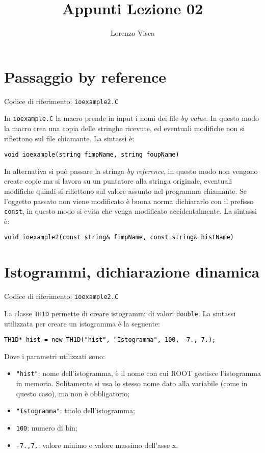 \documentclass{article}
\title{Appunti Lezione 02}
\author{Lorenzo Visca}
\date{}
\newcommand{\ttt}{\texttt}
\newcommand{\tcpp}[1]{\hspace{10pt}\colorbox{background}{\textcolor{black}{\texttt{#1}}}}
\begin{document}
\maketitle


\section{Passaggio by reference}
Codice di riferimento: \ttt{ioexample2.C} \vspace{10pt}

In \ttt{ioexample.C} la macro prende in input i nomi dei file \textit{by value}. In questo modo la macro crea una copia delle stringhe ricevute, ed eventuali modifiche non si riflettono sul file chiamante. La sintassi è:

\tcpp{void ioexample(string fimpName, string foupName)}

In alternativa si può passare la stringa \textit{by reference}, in questo modo non vengono create copie ma si lavora su un puntatore alla stringa originale, eventuali modifiche quindi si riflettono sul valore assunto nel programma chiamante. 
Se l'oggetto passato non viene modificato è buona norma dichiararlo con il prefisso \ttt{const}, in questo modo si evita che venga modificato accidentalmente. La sintassi è:

\tcpp{void ioexample2(const string\& fimpName, const string\& histName)}

\section{Istogrammi, dichiarazione dinamica}
Codice di riferimento: \ttt{ioexample2.C} \vspace{10pt}

La classe \ttt{TH1D} permette di creare istogrammi di valori \ttt{double}. La sintassi utilizzata per creare un istogramma è la seguente:

\tcpp{TH1D* hist = new TH1D("hist", "Istogramma", 100, -7., 7.);}

Dove i parametri utilizzati sono:
\begin{itemize}
    \item \ttt{"hist"}: nome dell'istogramma, è il nome con cui ROOT gestisce l'istogramma in memoria. Solitamente si usa lo stesso nome dato alla variabile (come in questo caso), ma non è obbligatorio;
    \item \ttt{"Istogramma"}: titolo dell'istogramma;
    \item \ttt{100}: numero di bin;
    \item \ttt{-7.,7.}: valore minimo e valore massimo dell'asse x.
\end{itemize}
\end{document}
